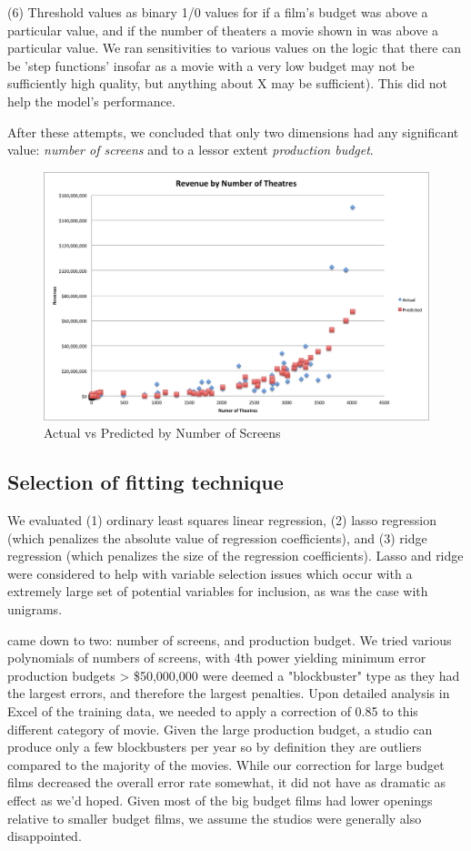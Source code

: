 \documentclass[11pt, oneside]{article}   	%
\begin{document}
(6) Threshold values as binary 1/0 values for if a film's budget was above a particular value, and if the number of theaters a movie shown in was above a particular value. We ran sensitivities to various values on the logic that there can be 'step functions' insofar as a movie with a very low budget may not be sufficiently high quality, but anything about X may be sufficient). This did not help the model's performance.


After these attempts, we concluded that only two dimensions had any significant value: \emph{number of screens} and to a lessor extent \emph{production budget}.

\begin{figure}[h!] 
\centering
\includegraphics[scale=0.55]{numberOfTheatres}
\caption{Actual vs Predicted by Number of Screens}
\end{figure}


\subsection*{Selection of fitting technique}

We evaluated (1) ordinary least squares linear regression, (2) lasso regression (which penalizes the absolute value of regression coefficients), and (3) ridge regression (which penalizes the size of the regression coefficients). Lasso and ridge were considered to help with variable selection issues which occur with a extremely large set of potential variables for inclusion, as was the case with unigrams.

came down to two: number of screens, and production budget. We tried various polynomials of numbers of screens, with 4th power yielding minimum error
production budgets > \$50,000,000 were deemed a "blockbuster" type as they had the largest errors, and therefore the largest penalties. Upon detailed analysis in Excel of the training data, we needed to apply a correction of 0.85 to this different category of movie. Given the large production budget, a studio can produce only a few blockbusters per year so by definition they are outliers compared to the majority of the movies. While our correction for large budget films decreased the overall error rate somewhat, it did not have as dramatic as effect as we'd hoped. Given most of the big budget films had lower openings relative to smaller budget films, we assume the studios were generally also disappointed.
\end{document}
